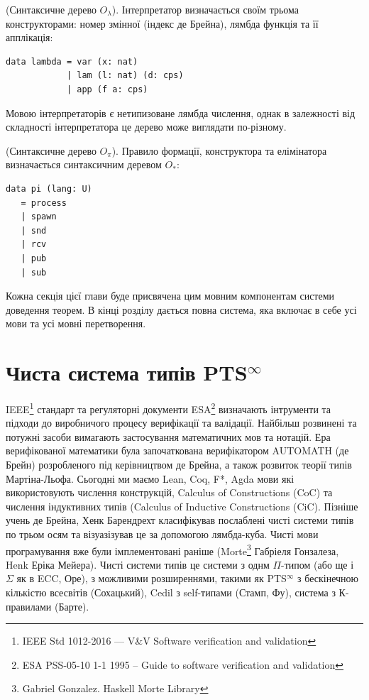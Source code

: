 \begin{definition} (Синтаксичне дерево $O_\lambda$). Інтерпретатор визначається
своїм трьома конструкторами: номер змінної (індекс де Брейна),
лямбда функція та її апплікація:
\begin{lstlisting}
data lambda = var (x: nat)
            | lam (l: nat) (d: cps)
            | app (f a: cps)
\end{lstlisting}
Мовою інтерпретаторів є нетипизоване лямбда числення, однак в залежності
від складності інтерпретатора це дерево може виглядати по-різному.
\end{definition}

\begin{definition} (Синтаксичне дерево $O_\pi$).
Правило формації, конструктора та елімінатора визначається синтаксичним деревом $O_*$:
\begin{lstlisting}
data pi (lang: U)
   = process
   | spawn
   | snd
   | rcv
   | pub
   | sub
\end{lstlisting}
\end{definition}

Кожна секція цієї глави буде присвячена цим мовним компонентам
системи доведення теорем. В кінці розділу дається повна система, яка включає в себе усі
мови та усі мовні перетворення.



\newpage
\section{Чиста система типів PTS$^\infty$}

IEEE\footnote{IEEE Std 1012-2016  --- V\&V Software verification and validation} стандарт
та регуляторні документи ESA\footnote{ESA PSS-05-10 1-1 1995 -- Guide to software verification and validation}
визначають інтрументи та підходи до виробничого процесу верифікації та валідації.
Найбільш розвинені та потужні засоби вимагають застосування математичних мов та нотацій.
Ера верифікованої математики була започаткована верифікатором AUTOMATH\cite{deBruijn83} (де Брейн) розробленого
під керівництвом де Брейна, а також розвиток теорії типів Мартіна-Льофа\cite{Lof84}.
Сьогодні ми маємо Lean, Coq, F*, Agda мови які використовують числення
конструкцій, Calculus of Constructions\cite{Coq88} (CoC)
та числення індуктивних типів (Calculus of Inductive Constructions\cite{Pfenning89} (CiC).
Пізніше учень де Брейна, Хенк Барендрехт класифікував послаблені чисті
системи типів по трьом осям та візуазізував це за допомогою лямбда-куба\cite{Henk93}.
Чисті мови програмування вже були імплементовані раніше
(Morte\footnote{Gabriel Gonzalez. Haskell Morte Library} Габріеля Гонзалеза, Henk\cite{Erik97} Еріка Мейера).
Чисті системи типів це системи з однм $\Pi$-типом (або ще і $\Sigma$ як в ECC\cite{Ore92}, Оре),
з можливими розширеннями, такими як PTS$^\infty$ з бескінечною кількістю всесвітів\cite{Tonpa18} (Сохацький),
Cedil з self-типами\cite{Fu14}\cite{Stump17} (Стамп, Фу), система з К-правилами\cite{Barthe95} (Барте).

